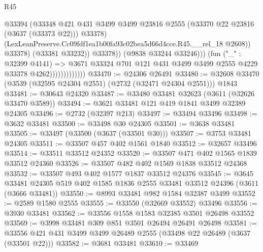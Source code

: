 \begin{lexlean}{R45}
\begin{coremodule}
                                          @33394
                                          (@33348
                                            @421
                                            @431
                                            @3499
                                            @3499
                                            @23816
                                            @2555
                                            (@33370 @22 @23816 (@3637 (@33373 @22)))
                                            @33378)
                                          (LexLeanPreserve.Cc09fdf1ea1b00fa93c02bea5d66d4cce.R45.__rel_18
                                            @2608))
                                        @33378)
                                      (@33381 @33232))
                                    @33378))
                                (@9838 @33244 @33246)))
                            (fun ("_" : @32399 @4141) =>
                            @3671
                              @33324
                              @701
                              @121
                              @431
                              @3499
                              @3499
                              @2555
                              @4229
                              @33378
                              @4262)))))))))))))
@33470 := @24306 @26491
@33480 := @32608 @33470 (@3539 (@32595 @24304 @2551) (@2732 (@32471 @24304 @2551))) @1843
@33481 := @30643 @24320
@33487 := @33480 @33481 @32623 (@3611 (@32626 @33470 @3589))
@33494 := @3621 @33481 @121 @419 @1841 @3499 @32389 @24305
@33496 := @2732 (@32397 @213)
@33497 := @33494 @33496
@33498 := @3632 @33481
@33500 := @33498 @30 @24305
@33501 := @3638 @33481
@33505 := @33497 (@33500 (@3637 (@33501 @30)))
@33507 := @3753 @33481 @24305
@33511 := @33507 @457 @402 @1561 @1840
@33512 := @32657 @33496
@33514 := @33511 @33512 @24352
@33520 := @33507 @471 @402 @1565 @1839 @33512 @24360
@33526 := @33507 @482 @402 @1569 @1838 @33512 @24368
@33532 := @33507 @493 @402 @1577 @1837 @33512 @24376
@33545 := @3645
    @33481
    @24305
    @519
    @402
    @1585
    @1836
    @2555
    @33481
    @33512
    @24396
    (@3611 (@3666 @33481))
@33550 := @8993 @33481 @982 @1584 @32387 @3499
@33552 := @2589 @1580 @2555
@33555 := @33550 (@32669 @33552) @33496
@33556 := @3930 @33481
@33562 := @33556 @1558 @1583 @32385 @3501 @26498 @33552
@33569 := @3998 @33481 @309 @851 @3501 @26494 @26491 @26498
@33581 := @33556 @421 @431 @3499 @3499 @26489 @2555 (@33498 @22 @26489 (@3637 (@33501 @22)))
@33582 := @3681 @33481
@33610 := @33469

\end{coremodule}
\end{lexlean}
